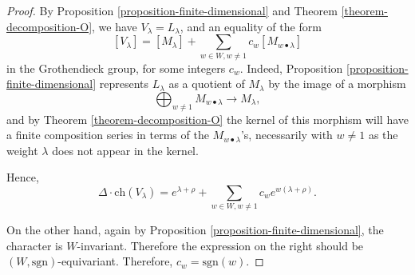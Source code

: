 \begin{proof}
By Proposition \ref{proposition-finite-dimensional} and Theorem \ref{theorem-decomposition-O}, we have $V_\lambda=L_\lambda$, and an equality of the form  
$$[V_\lambda]= [M_{\lambda}] + \sum_{w\in W, w\ne 1} c_w [M_{w\bullet \lambda}]$$
in the Grothendieck group, for some integers $c_w$. Indeed, Proposition \ref{proposition-finite-dimensional} represents $L_\lambda$ as a quotient of $M_\lambda$ by the image of a morphism 
$$\bigoplus_{w\ne 1} M_{w\bullet \lambda} \to M_\lambda,$$
and by Theorem \ref{theorem-decomposition-O} the kernel of this morphism will have a finite composition series in terms of the $M_{w\bullet \lambda}$'s, necessarily with $w\ne 1$ as the weight $\lambda$ does not appear in the kernel.

Hence,
$$ \Delta \cdot \text{ch}(V_\lambda) = e^{\lambda+\rho} + \sum_{w\in W,w\ne 1} c_w e^{w(\lambda+\rho)}.$$

On the other hand, again by Proposition \ref{proposition-finite-dimensional}, the character is $W$-invariant. Therefore the expression on the right should be $(W,\text{sgn})$-equivariant. Therefore, $c_w = \text{sgn}(w)$.
\end{proof}













